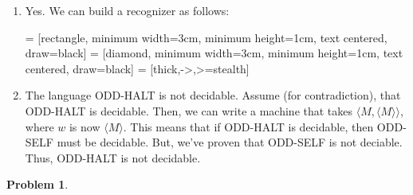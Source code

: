 \documentclass[11pt]{article}
\theoremstyle{definition}
\theoremstyle{case}
\theoremstyle{theorem}
\newtheorem{prob}{Problem}
\begin{document}
\begin{enumerate}[label=(\alph*)]
\item

Yes. We can build a recognizer as follows:

 = [rectangle, minimum width=3cm, minimum height=1cm, text centered, draw=black]
 = [diamond, minimum width=3cm, minimum height=1cm, text centered, draw=black]
 = [thick,->,>=stealth]


\item

The language ODD-HALT is not decidable. Assume (for contradiction), that ODD-HALT is decidable. 
Then, we can write a machine that takes $\langle M, \langle M \rangle \rangle$, where $w$ is now $\langle M \rangle$.
This means that if ODD-HALT is decidable, then ODD-SELF must be decidable. But, we've proven
that ODD-SELF is not deciable. Thus, ODD-HALT is not decidable.

\end{enumerate}

\newpage

\begin{prob}\end{prob}
\end{document}
